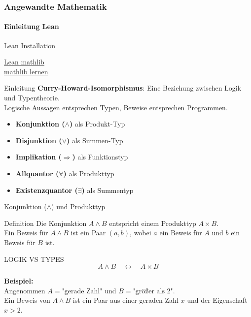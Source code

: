 \documentclass{beamer}
\begin{document}
 \begin{frame}
    \frametitle{Angewandte Mathematik}
\framesubtitle{Einleitung Lean}
    \begin{block}{Lean Installation}

        
        \href{https://github.com/leanprover-community/mathlib4}{Lean mathlib} \\
        \href{https://adam.math.hhu.de/}{mathlib lernen} 


    \end{block}

 \end{frame}


\begin{frame}{Einleitung}
    \textbf{Curry-Howard-Isomorphismus}: Eine Beziehung zwischen Logik und Typentheorie. \\
    \vspace{0.5cm}
    Logische Aussagen entsprechen Typen, Beweise entsprechen Programmen. \\
    \vspace{0.5cm}
    \begin{itemize}
        \item \textbf{Konjunktion (\(\wedge\))} als Produkt-Typ
        \item \textbf{Disjunktion (\(\vee\))} als Summen-Typ
        \item \textbf{Implikation (\(\Rightarrow\))} als Funktionstyp
        \item \textbf{Allquantor (\(\forall\))} als Produkttyp
        \item \textbf{Existenzquantor (\(\exists\))} als Summentyp
    \end{itemize}
\end{frame}

\begin{frame}{Konjunktion (\(\wedge\)) und Produkttyp}
    \begin{block}{Definition}
        Die Konjunktion \( A \wedge B \) entspricht einem Produkttyp \( A \times B \). \\
        Ein Beweis für \( A \wedge B \) ist ein Paar \((a, b)\), wobei \( a \) ein Beweis für \( A \) und \( b \) ein Beweis für \( B \) ist.
    \end{block}

    \begin{block}{LOGIK VS TYPES}
        \[
        A \wedge B \quad \leftrightarrow \quad A \times B
        \]
    \end{block}
    
    \textbf{Beispiel:} \\
    Angenommen \( A = \text{"gerade Zahl"} \) und \( B = \text{"größer als 2"} \). \\
    Ein Beweis von \( A \wedge B \) ist ein Paar aus einer geraden Zahl \( x \) und der Eigenschaft \( x > 2 \).
\end{frame}
\end{document}
